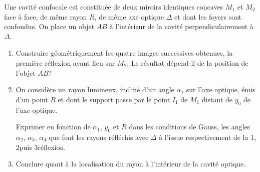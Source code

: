 \begin{exercice}
  Une cavité confocale est constituée de deux miroirs identiques concaves \(M_1\) et \(M_2\) face à face, de même rayon \(R\), de même axe optique \(\Delta\) et dont les foyers sont confondus. On place un objet \(AB\) à l'intérieur de la cavité perpendiculairement à \(\Delta\).
%
  \begin{enumerate}
  \item Construire géométriquement les quatre images successives obtenues, la première réflexion ayant lieu sur \(M_2\). Le résultat dépend-il de la position de l'objet \(AB\)?
  \item On considère un rayon lumineux, incliné d'un angle \(\alpha_1\) sur l'axe optique, émis d'un point \(B\) et dont le support passe par le point \(I_1\) de \(M_1\) distant de \(y_0\) de l'axe optique.

    Exprimer en fonction de \(\alpha_1\), \(y_0\) et \(R\) dans les conditions de Gauss, les angles \(\alpha_2\), \(\alpha_3\), \(\alpha_4\) que font les rayons réfléchis avec \(\Delta\) à l'issue respectivement de la 1\iere, 2\ieme puis 3\ieme réflexion.
  \item Conclure quant à la localisation du rayon à l'intérieur de la cavité optique.
  \end{enumerate}
\end{exercice}
%
